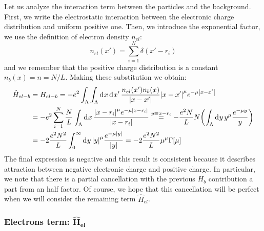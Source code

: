 \documentclass[11pt, a4paper, twoside, openright]{article}
\begin{document}
Let us analyze the interaction term between the particles and the background. First, we write the electrostatic interaction between the electronic charge distribution and uniform positive one. Then, we introduce the exponential factor, we use the definition of electron density \( n_{el} \):
\begin{equation}
  n_{el}(x') = \sum_{i=1}^{N} \delta (x'-r_i)
\end{equation}
and we remember that the positive charge distribution is a constant \( n_b (x)= n = N/L \). Making these substitution we obtain:
\begin{equation}
\begin{split}
  \hat{H}_{el-b} &= H_{el-b} = - e^2 \int_{\Lambda }^{} \int_{\Lambda }^{} \dd[]{x} \dd[]{x'} \frac{n_{el} (x') n_b (x) }{\abs{x-x'}  } \abs{x-x'}^\mu e^{-\mu \abs{x-x'} } \\
  &= - e^2 \sum_{i=1}^{N} \frac{N}{L} \int_{\Lambda }^{} \dd[]{x} \frac{ \abs{x-r_i}^\mu e^{-\mu \abs{x-r_i} } }{\abs{x-r_i} } \overset{y \equiv x- r_i}{=} -\frac{e^2 N}{L} N \qty(\int_{\Lambda }^{} \dd[]{y} y^\mu \frac{e^{-\mu y} }{y}  ) \\
  &= - 2 \frac{e^2N^2}{L}\int_{0}^{\infty } \dd[]{y} \abs{y} ^\mu \frac{e^{-\mu \abs{y} }}{\abs{y} }
  = - 2 \frac{ e^2 N^2}{L }  \mu^\mu \Gamma [\mu]
\end{split}
\end{equation}
The final expression is negative and this result is consistent because it describes attraction between negative electronic charge and positive charge. In particular, we note that there is a partial cancellation with the previous \( H_b \) contribution a part from an half factor. Of course, we hope that this cancellation will be perfect when we will consider the remaining term \( \hat{H}_{el}  \).











\subsubsection*{Electrons term: \( \mathbf{\hat{H}_{el}}  \)}
\end{document}
